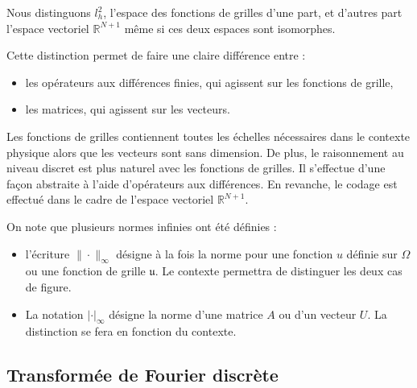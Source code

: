 Nous distinguons $l^2_h$, l'espace des fonctions de grilles d'une part, et d'autres part l'espace vectoriel $\mathbb{R}^{N+1}$ même si ces deux espaces sont isomorphes.

Cette distinction permet de faire une claire différence entre :
\begin{itemize}
\item les opérateurs aux différences finies, qui agissent sur les fonctions de grille,
\item les matrices, qui agissent sur les vecteurs.
\end{itemize}
Les fonctions de grilles contiennent toutes les échelles nécessaires dans le contexte physique alors que les vecteurs sont sans dimension. De plus, le raisonnement au niveau discret est plus naturel avec les fonctions de grilles. Il s'effectue d'une façon abstraite à l'aide d'opérateurs aux différences. En revanche, le codage est effectué dans le cadre de l'espace vectoriel $\mathbb{R}^{N+1}$.

On note que plusieurs normes infinies ont été définies :
\begin{itemize}
\item l'écriture $\| \cdot \|_{\infty}$ désigne à la fois la norme pour une fonction $u$ définie sur $\Omega$ ou une fonction de grille $\mathfrak{u}$. Le contexte permettra de distinguer les deux cas de figure.
\item La notation $| \cdot |_{\infty}$ désigne la norme d'une matrice $A$ ou d'un vecteur $U$. La distinction se fera en fonction du contexte.
\end{itemize}




















\subsection{Transformée de Fourier discrète}

